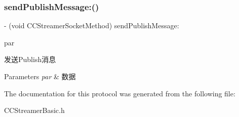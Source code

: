 \subsubsection{\texorpdfstring{send\+Publish\+Message\+:()}{sendPublishMessage:()}}
{\footnotesize\ttfamily -\/ (void C\+C\+Streamer\+Socket\+Method) send\+Publish\+Message\+: \begin{DoxyParamCaption}\item[{(N\+S\+Dictionary $\ast$)}]{par }\end{DoxyParamCaption}}

发送\+Publish消息


\begin{DoxyParams}{Parameters}
{\em par} & 数据 \\
\hline
\end{DoxyParams}


The documentation for this protocol was generated from the following file\+:\begin{DoxyCompactItemize}
\item 
C\+C\+Streamer\+Basic.\+h\end{DoxyCompactItemize}
